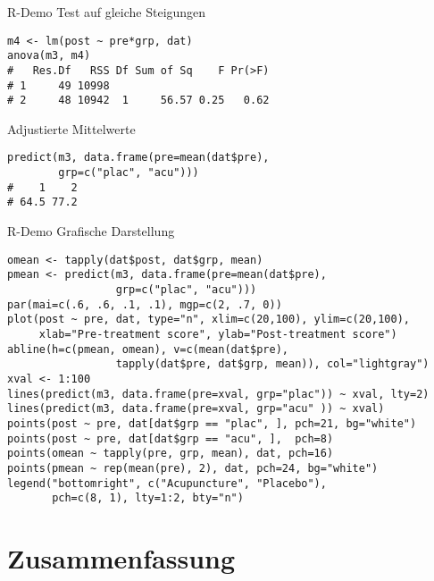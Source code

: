 \documentclass{beamer}
\begin{document}
\begin{frame}[fragile]{R-Demo}{}
%
Test auf gleiche Steigungen
\lstset{texcl=false}
\begin{lstlisting}
m4 <- lm(post ~ pre*grp, dat)
anova(m3, m4)
#   Res.Df   RSS Df Sum of Sq    F Pr(>F)
# 1     49 10998                         
# 2     48 10942  1     56.57 0.25   0.62
\end{lstlisting}

%
Adjustierte Mittelwerte
\lstset{texcl=false}
\begin{lstlisting}
predict(m3, data.frame(pre=mean(dat$pre),
        grp=c("plac", "acu")))
#    1    2 
# 64.5 77.2 
\end{lstlisting}
%
\end{frame}

\begin{frame}[fragile]{R-Demo}{}
%
Grafische Darstellung
\begin{lstlisting}
omean <- tapply(dat$post, dat$grp, mean)
pmean <- predict(m3, data.frame(pre=mean(dat$pre),
                 grp=c("plac", "acu")))
par(mai=c(.6, .6, .1, .1), mgp=c(2, .7, 0))
plot(post ~ pre, dat, type="n", xlim=c(20,100), ylim=c(20,100),
     xlab="Pre-treatment score", ylab="Post-treatment score")
abline(h=c(pmean, omean), v=c(mean(dat$pre),
                 tapply(dat$pre, dat$grp, mean)), col="lightgray")
xval <- 1:100
lines(predict(m3, data.frame(pre=xval, grp="plac")) ~ xval, lty=2)
lines(predict(m3, data.frame(pre=xval, grp="acu" )) ~ xval)
points(post ~ pre, dat[dat$grp == "plac", ], pch=21, bg="white")
points(post ~ pre, dat[dat$grp == "acu", ],  pch=8)
points(omean ~ tapply(pre, grp, mean), dat, pch=16)
points(pmean ~ rep(mean(pre), 2), dat, pch=24, bg="white")
legend("bottomright", c("Acupuncture", "Placebo"),
       pch=c(8, 1), lty=1:2, bty="n")
\end{lstlisting}
%
\end{frame}


\section{Zusammenfassung}
\end{document}
